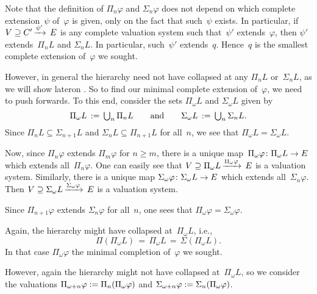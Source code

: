 \documentclass[main.tex]{subfiles}
\begin{document}
Note that the definition of $\Pi_n \varphi$
and $\Sigma_n \varphi$ does not depend
on which complete extension~$\psi$ of~$\varphi$ is given,
only on the fact that such~$\psi$ exists.
In particular,
if $V \supseteq C'\,\smash{\xrightarrow{\psi'}\,E}$ is any complete valuation system
such that~$\psi'$ extends~$\varphi$,
then $\psi'$ extends~$\Pi_n L$ and $\Sigma_n L$.
In particular,
such~$\psi'$ extends~$q$.
Hence~$q$ is the smallest complete extension of~$\varphi$ we sought.

However,
in general the hierarchy need not have collapsed at
any $\Pi_n L$ or~$\Sigma_n L$,
as we will show lateron .
So to find our minimal complete extension of~$\varphi$,
we need to push forwards.
To this end, consider the sets $\Pi_\omega L$
and $\Sigma_\omega L$ given by
\begin{equation*}
\Pi_\omega L \,:=\,\textstyle{\bigcup_n}\, \Pi_n L
\qquad\text{and}\qquad
\Sigma_\omega L \,:=\, \textstyle{\bigcup_n}\, \Sigma_n L.
\end{equation*}
Since $\Pi_{n} L \subseteq \Sigma_{n+1} L$
and $\Sigma_{n} L \subseteq \Pi_{n+1}L$ for all~$n$,
we see that $\Pi_\omega L = \Sigma_\omega L$.

Now,
since $\Pi_n\varphi$ extends $\Pi_m\varphi$
for $n\geq m$,
there is a unique map~$\Pi_\omega \varphi\colon \Pi_\omega L \rightarrow E$
which extends all~$\Pi_n \varphi$.
One can easily see that $V \supseteq \Pi_\omega L\,\smash{\xrightarrow{\Pi_\omega\varphi}\,E}$
is a valuation system.
Similarly, there is a unique map 
$\Sigma_\omega \varphi \colon \Sigma_\omega L \rightarrow E$
which extends all~$\Sigma_n\varphi$.
Then $V \supseteq \Sigma_\omega L\,\smash{\xrightarrow{\Sigma_\omega\varphi}\,E}$
is a valuation system.

Since $\Pi_{n+1}\varphi$ extends $\Sigma_{n}\varphi$
for all~$n$, one sees that $\Pi_\omega\varphi = \Sigma_\omega\varphi$.

Again, the hierarchy might have collapsed at~$\Pi_\omega L$,
i.e.,
\begin{equation*}
\Pi(\Pi_\omega L ) \,=\, \Pi_\omega L \,=\, \Sigma(\Pi_\omega L).
\end{equation*}
In that case $\Pi_\omega\varphi$ the minimal completion of~$\varphi$
we sought.

However,
again the hierarchy
might not have collapsed at~$\Pi_\omega L$,
so we consider the valuations
 $\Pi_{\omega+n}\varphi:=\Pi_{n} (\Pi_\omega \varphi)$
and $\Sigma_{\omega+n}\varphi := \Sigma_{n}(\Pi_\omega\varphi)$.
\end{document}
